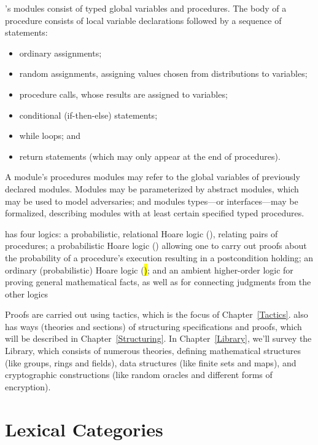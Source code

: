 \EasyCrypt's modules consist of typed global variables and procedures.
The body of a procedure consists of local variable declarations followed
by a sequence of statements:
\begin{itemize}
\item ordinary assignments;

\item random assignments, assigning values chosen
  from distributions to variables;

\item procedure calls, whose results are assigned to variables;

\item conditional (if-then-else) statements;

\item while loops; and

\item return statements (which may only appear at the end of
  procedures).
\end{itemize}
A module's procedures modules may refer to the global variables of
previously declared modules. Modules may be parameterized by abstract
modules, which may be used to model adversaries; and modules
types---or interfaces---may be formalized, describing modules with at
least certain specified typed procedures.

\EasyCrypt has four logics: a probabilistic, relational Hoare logic
(\prhl), relating pairs of procedures; a probabilistic Hoare logic
(\phl) allowing one to carry out proofs about the probability of a
procedure's execution resulting in a postcondition holding; an
ordinary (probabilistic) Hoare logic (\hl); and an ambient
higher-order logic for proving general mathematical facts, as well as
for connecting judgments from the other logics

Proofs are carried out using tactics, which is the focus of
Chapter~\ref{Tactics}.  \EasyCrypt also has ways (theories and
sections) of structuring specifications and proofs, which will be
described in Chapter~\ref{Structuring}. In Chapter~\ref{Library},
we'll survey the \EasyCrypt Library, which consists of numerous
theories, defining mathematical structures (like groups, rings
and fields), data structures (like finite sets and maps), and
cryptographic constructions (like random oracles and different
forms of encryption).

\section{Lexical Categories}
\label{Lexical}

